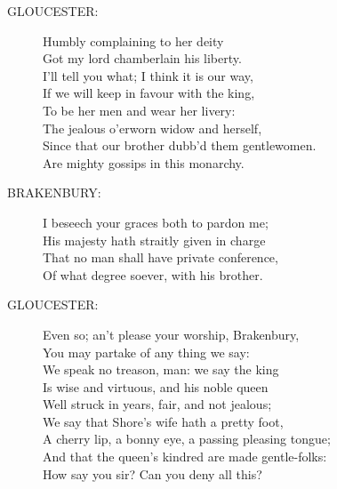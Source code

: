 \documentclass{article}
\begin{document}
\begin{description}
\item[GLOUCESTER:] 
\hspace{1pt}Humbly complaining to her deity\\
\hspace{1pt}Got my lord chamberlain his liberty.\\
\hspace{1pt}I'll tell you what; I think it is our way,\\
\hspace{1pt}If we will keep in favour with the king,\\
\hspace{1pt}To be her men and wear her livery:\\
\hspace{1pt}The jealous o'erworn widow and herself,\\
\hspace{1pt}Since that our brother dubb'd them gentlewomen.\\
\hspace{1pt}Are mighty gossips in this monarchy.\\
\end{description}
\begin{description}
\item[BRAKENBURY:] 
\hspace{1pt}I beseech your graces both to pardon me;\\
\hspace{1pt}His majesty hath straitly given in charge\\
\hspace{1pt}That no man shall have private conference,\\
\hspace{1pt}Of what degree soever, with his brother.\\
\end{description}
\begin{description}
\item[GLOUCESTER:] 
\hspace{1pt}Even so; an't please your worship, Brakenbury,\\
\hspace{1pt}You may partake of any thing we say:\\
\hspace{1pt}We speak no treason, man: we say the king\\
\hspace{1pt}Is wise and virtuous, and his noble queen\\
\hspace{1pt}Well struck in years, fair, and not jealous;\\
\hspace{1pt}We say that Shore's wife hath a pretty foot,\\
\hspace{1pt}A cherry lip, a bonny eye, a passing pleasing tongue;\\
\hspace{1pt}And that the queen's kindred are made gentle-folks:\\
\hspace{1pt}How say you sir? Can you deny all this?\\
\end{description}
\end{document}
